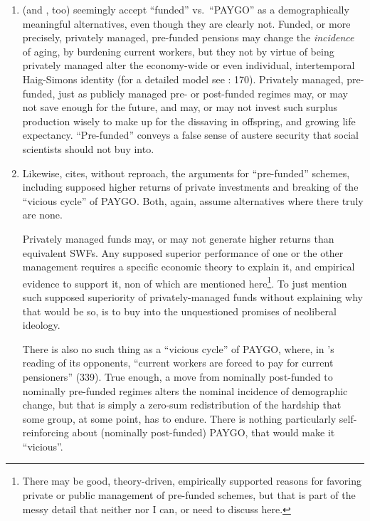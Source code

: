 \begin{enumerate}
	\item \citeauthor{Cerami2009a} (and \citealt{Bastian1998}, too) seemingly accept ``funded'' vs.\ ``PAYGO'' as a demographically meaningful alternatives, even though they are clearly not. Funded, or more precisely, privately managed, pre-funded pensions may change the \emph{incidence} of aging, by burdening current workers, but they not by virtue of being privately managed alter the economy-wide or even individual, intertemporal Haig-Simons identity (for a detailed model see \citealt{Borsch-Supan2003}: 170). Privately managed, pre-funded, just as publicly managed pre- or post-funded regimes may, or may not save enough for the future, and may, or may not invest such surplus production wisely to make up for the dissaving in offspring, and growing life expectancy. ``Pre-funded'' conveys a false sense of austere security that social scientists should not buy into.

	\item Likewise, \citeauthor{Cerami2009a} cites, without reproach, the arguments for ``pre-funded'' schemes, including supposed higher returns of private investments and breaking of the ``vicious cycle'' of PAYGO. Both, again, assume alternatives where there truly are none.

	Privately managed funds may, or may not generate higher returns than equivalent \glspl{SWF}. Any supposed superior performance of one or the other management requires a specific economic theory to explain it, and empirical evidence to support it, non of which are mentioned here\footnote{
		There may be good, theory-driven, empirically supported reasons for favoring private or public management of pre-funded schemes, but that is part of the messy detail that neither \citeauthor{Cerami2009a} nor I can, or need to discuss here.}.
	To just mention such supposed superiority of privately-managed funds without explaining why that would be so, is to buy into the unquestioned promises of neoliberal ideology.

	There is also no such thing as a ``vicious cycle'' of PAYGO, where, in \citeauthor{Cerami2009a}'s reading of its opponents, ``current workers are forced to pay for current pensioners'' (339). True enough, a move from nominally post-funded to nominally pre-funded regimes alters the nominal incidence of demographic change, but that is simply a zero-sum redistribution of the hardship that some group, at some point, has to endure. There is nothing particularly self-reinforcing about (nominally post-funded) PAYGO, that would make it ``vicious''.


\end{enumerate}
